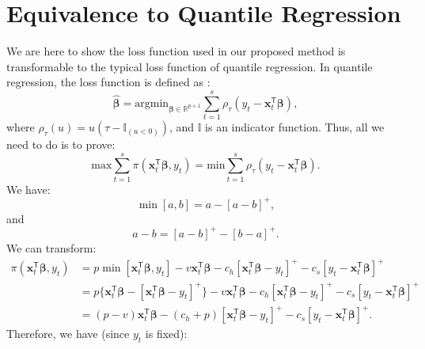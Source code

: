 \documentclass{article}
\begin{document}
\section{Equivalence to Quantile Regression}
\label{app:C}
We are here to show the loss function used in our proposed method is transformable to the typical loss function of quantile regression. In quantile regression, the loss function is defined as \cite{KH01}:
\[
    \hat{\boldsymbol{\beta}}=\text{argmin}_{\boldsymbol{\beta}\in \mathbb{R}^{p+1}}\displaystyle\sum_{t=1}^s\rho_{\tau}(y_t-\mathbf{x}_t^{\mathsf{T}}\boldsymbol{\beta}),
\]
where $\displaystyle \rho_{\tau}(u)=u(\tau-\mathbb{I}_{(u<0)})$, and $\mathbb{I}$ is an indicator function. Thus, all we need to do is to prove:
\[
    \text{max}\displaystyle\sum_{t=1}^s{\pi(\mathbf{x}_t^{\mathsf{T}}\boldsymbol{\beta},y_t)}=\text{min}\displaystyle\sum_{t=1}^s\rho_{\tau}(y_t-\mathbf{x}_t^{\mathsf{T}}\boldsymbol{\beta}).
\]
We have:
\[
    \min[a,b]=a-[a-b]^+,
\]
and
\[
    a-b=[a-b]^+-[b-a]^+.
\]
We can transform:
\[
    \begin{aligned}
        \pi(\mathbf{x}_t^{\mathsf{T}}\boldsymbol{\beta},y_t)
        &=p\min[\mathbf{x}_t^{\mathsf{T}}\boldsymbol{\beta},y_t]-v\mathbf{x}_t^{\mathsf{T}}\boldsymbol{\beta}-c_h[\mathbf{x}_t^{\mathsf{T}}\boldsymbol{\beta}-y_t]^+-c_s[y_t-\mathbf{x}_t^{\mathsf{T}}\boldsymbol{\beta}]^+\\
        &=p\{\mathbf{x}_t^{\mathsf{T}}\boldsymbol{\beta}-[\mathbf{x}_t^{\mathsf{T}}\boldsymbol{\beta}-y_t]^+\}-v\mathbf{x}_t^{\mathsf{T}}\boldsymbol{\beta}-c_h[\mathbf{x}_t^{\mathsf{T}}\boldsymbol{\beta}-y_t]^+-c_s[y_t-\mathbf{x}_t^{\mathsf{T}}\boldsymbol{\beta}]^+\\
        &=(p-v)\mathbf{x}_t^{\mathsf{T}}\boldsymbol{\beta}-(c_h+p)[\mathbf{x}_t^{\mathsf{T}}\boldsymbol{\beta}-y_t]^+-c_s[y_t-\mathbf{x}_t^{\mathsf{T}}\boldsymbol{\beta}]^+.
    \end{aligned}
\]
Therefore, we have (since $y_t$ is fixed):
\end{document}
